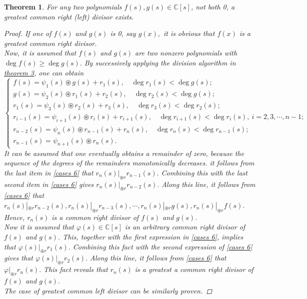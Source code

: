 \documentclass[12pt,a4paper,fleqn,twoside]{article}
\theoremstyle{plain}
\newtheorem{theorem}{Theorem}
\begin{document}
	\begin{theorem}\label{theorem 4}
		For any two polynomials $f(s),g(s)\in \mathbb{C}[s]$, not both 0, a greatest common right (left) divisor exists.
		\begin{proof}
			If one of $f(s)$ and $g(s)$ is 0, say $g(x),$ it is obvious that $f(x)$ is a greatest common right divisor.\\
			\indent Now, it is assumed that $f(s)$ and $g(s)$ are two nonzero polynomials with $\deg f(s)\ge \deg g(s).$ By successively applying the division algorithm in \hyperref[theorem 3]{theorem 3}, one can obtain 
			\begin{equation}\label{cases 6}
				\begin{cases}
					f(s)=\psi_1(s)\circledast g(s)+r_1(s),\quad \deg r_1(s)<\deg g(s);\\
					g(s)=\psi_2(s)\circledast r_1(s)+r_2(s),\quad \deg r_2(s)<\deg g(s);\\
					r_1(s)=\psi_3(s)\circledast r_2(s)+r_3(s),\quad \deg r_3(s)<\deg r_2(s);\\
					r_{i-1}(s)=\psi_{i+1}(s)\circledast r_i(s)+r_{i+1}(s),\quad \deg r_{i+1}(s)<\deg r_i(s),\: i=2,3,\cdots , n-1;\\
					r_{n-2}(s)=\psi_n(s)\circledast r_{n-1}(s)+r_n(s),\quad \deg r_n(s)<\deg r_{n-1}(s);\\
					r_{n-1}(s)=\psi_{n+1}(s)\circledast r_n(s).
				\end{cases}
			\end{equation}
			It can be assumed that one eventually obtains a remainder of zero, because the sequence of the degrees of the remainders monotonically decreases. it follows from the last item in \eqref{cases 6} that $r_n(s)|_{\circledast r}r_{n-1}(s).$ Combining this with the last second item in \eqref{cases 6} gives $r_n(s)|_{\circledast r}r_{n-2}(s).$ Along this line, it follows from \eqref{cases 6} that $r_n(s)|_{\circledast r}r_{n-2}(s),r_n(s)|_{\circledast r}r_{n-3}(s),\cdots, r_n(s)|_{\circledast r}g(s), r_n(s)|_{\circledast r}f(s).$ Hence, $r_n(s)$ is a common right divisor of $f(s)$ and $g(s)$.\\
			\indent Now it is assumed that $\varphi(s)\in \mathbb{C}[s]$ is an arbitrary common right divisor of $f(s)$ and $g(s)$. This, together with the first expression in \eqref{cases 6}, implies that $\varphi(s)|_{\circledast r}r_1(s).$ Combining this fact with the second expression of \eqref{cases 6} gives that $\varphi (s)|_{\circledast r}r_2(s).$ Along this line, it follows from \eqref{cases 6} that $\varphi|_{\circledast r}r_n(s).$ This fact reveals that $r_n(s)$ is a greatest a common right divisor of $f(s)$ and $g(s).$\\
			\indent The case of greatest common left divisor can be similarly proven. 
		\end{proof}
	\end{theorem}
\end{document}
